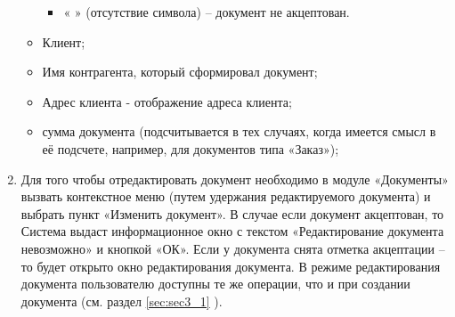 \begin{enumerate}[\thesection .1]
\begin{itemize}
\begin{itemize}
		\item « » (отсутствие символа) – документ не акцептован.
	\end{itemize}				
	\item Клиент;
	\item Имя контрагента, который сформировал документ;
	\item Адрес клиента - отображение адреса клиента;
	\item сумма документа (подсчитывается в тех случаях, когда имеется смысл в её подсчете, например, для документов типа «Заказ»);	
\end{itemize}		
\item Для того чтобы отредактировать документ необходимо в модуле «Документы» вызвать контекстное меню (путем удержания редактируемого документа) и выбрать пункт «Изменить документ». В случае если документ акцептован, то Система выдаст информационное окно с текстом «Редактирование документа невозможно» и кнопкой «ОК». Если у документа снята отметка акцептации – то будет открыто окно редактирования документа. 
В режиме редактирования документа пользователю доступны те же операции, что и при создании документа (см. раздел \ref{sec:sec3_1} ). 


\end{enumerate}